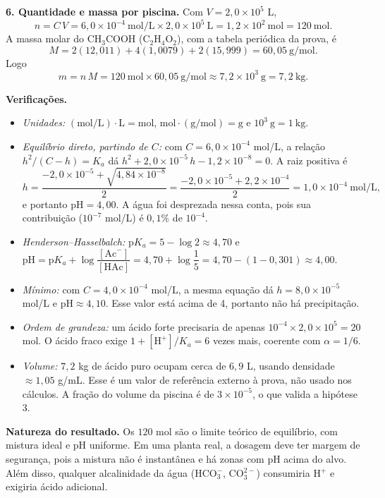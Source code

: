 \documentclass{article}%
\begin{document}
\textbf{6. Quantidade e massa por piscina.} Com $V = 2{,}0\times10^{5}$ L,
\[
n = C\,V = 6{,}0\times10^{-4}\ \text{mol/L} \times 2{,}0\times10^{5}\ \text{L} = 1{,}2\times10^{2}\ \text{mol} = 120\ \text{mol}.
\]
A massa molar do CH$_3$COOH (C$_2$H$_4$O$_2$), com a tabela periódica da prova, é
\[
M = 2(12{,}011) + 4(1{,}0079) + 2(15{,}999) = 60{,}05\ \text{g/mol}.
\]
Logo
\[
m = n\,M = 120\ \text{mol} \times 60{,}05\ \text{g/mol} \approx 7{,}2\times10^{3}\ \text{g} = 7{,}2\ \text{kg}.
\]

\textbf{Verificações.}
\begin{itemize}
\item \emph{Unidades:} $(\text{mol/L})\cdot\text{L} = \text{mol}$, $\text{mol}\cdot(\text{g/mol}) = \text{g}$ e $10^3\ \text{g} = 1\ \text{kg}$.
\item \emph{Equilíbrio direto, partindo de $C$:} com $C = 6{,}0\times10^{-4}$ mol/L, a relação $h^2/(C-h) = K_a$ dá $h^2 + 2{,}0\times10^{-5}\,h - 1{,}2\times10^{-8} = 0$. A raiz positiva é
\[
h = \frac{-2{,}0\times10^{-5} + \sqrt{4{,}84\times10^{-8}}}{2} = \frac{-2{,}0\times10^{-5} + 2{,}2\times10^{-4}}{2} = 1{,}0\times10^{-4}\ \text{mol/L},
\]
e portanto $\text{pH} = 4{,}00$. A água foi desprezada nessa conta, pois sua contribuição ($10^{-7}$ mol/L) é $0{,}1\%$ de $10^{-4}$.
\item \emph{Henderson--Hasselbalch:} $\text{p}K_a = 5 - \log 2 \approx 4{,}70$ e $\text{pH} = \text{p}K_a + \log\dfrac{[\text{Ac}^-]}{[\text{HAc}]} = 4{,}70 + \log\dfrac{1}{5} = 4{,}70 - (1 - 0{,}301) \approx 4{,}00$.
\item \emph{Mínimo:} com $C = 4{,}0\times10^{-4}$ mol/L, a mesma equação dá $h = 8{,}0\times10^{-5}$ mol/L e $\text{pH} \approx 4{,}10$. Esse valor está acima de 4, portanto não há precipitação.
\item \emph{Ordem de grandeza:} um ácido forte precisaria de apenas $10^{-4}\times2{,}0\times10^{5} = 20$ mol. O ácido fraco exige $1 + [\text{H}^+]/K_a = 6$ vezes mais, coerente com $\alpha = 1/6$.
\item \emph{Volume:} $7{,}2$ kg de ácido puro ocupam cerca de $6{,}9$ L, usando densidade $\approx 1{,}05$ g/mL. Esse é um valor de referência externo à prova, não usado nos cálculos. A fração do volume da piscina é de $3\times10^{-5}$, o que valida a hipótese 3.
\end{itemize}

\textbf{Natureza do resultado.} Os $120$ mol são o limite teórico de equilíbrio, com mistura ideal e pH uniforme. Em uma planta real, a dosagem deve ter margem de segurança, pois a mistura não é instantânea e há zonas com pH acima do alvo. Além disso, qualquer alcalinidade da água (HCO$_3^-$, CO$_3^{2-}$) consumiria H$^+$ e exigiria ácido adicional.
\end{document}
